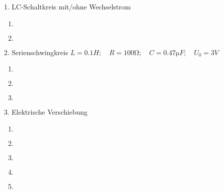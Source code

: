 \documentclass{alex_hü}
\begin{document}
\renewcommand{\labelenumi}{(\alph{enumi})}


\begin{mybox}{1. LC-Schaltkreis mit/ohne Wechselstrom}
	\centering \( \)
	\tcblower
	\begin{enumerate}
		\item \(  \)
%
	\tcbline
		\item \(  \)
%			
	\end{enumerate}
\end{mybox}

\begin{mybox}{2. Serienschwingkreis}
	\centering \( L = 0.1 \unit{H};\quad R = 100 \unit{\ohm};\quad C = 0.47 \unit{\micro F};\quad U_0 = 3 \unit{V} \)
	\tcblower
	\begin{enumerate}
		\item \(  \)
	\tcbline
		\item \(  \)
	\tcbline
		\item \(  \)
	\end{enumerate}
\end{mybox}

\begin{mybox}{3. Elektrische Verschiebung}
	\centering \( \)
	\tcblower
	\begin{enumerate}
		\item \(  \)
	\tcbline
		\item \(  \)
	\tcbline
		\item \(  \)
	\tcbline
		\item \(  \)
	\tcbline
		\item \(  \)
	\end{enumerate}
\end{mybox}
\end{document}
